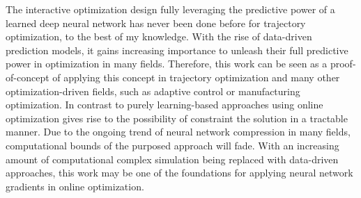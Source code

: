 The interactive optimization design fully leveraging the predictive power of a learned deep neural network has never been done before for trajectory optimization, to the best of my knowledge. With the rise of data-driven prediction models, it gains increasing importance to unleash their full predictive power in optimization in many fields. Therefore, this work can be seen as a proof-of-concept of applying this concept in trajectory optimization and many other optimization-driven fields, such as adaptive control or manufacturing optimization. In contrast to purely learning-based approaches using online optimization gives rise to the possibility of constraint the solution in a tractable manner. Due to the ongoing trend of neural network compression in many fields, computational bounds of the purposed approach will fade. With an increasing amount of computational complex simulation being replaced with data-driven approaches, this work may be one of the foundations for applying neural network gradients in online optimization.